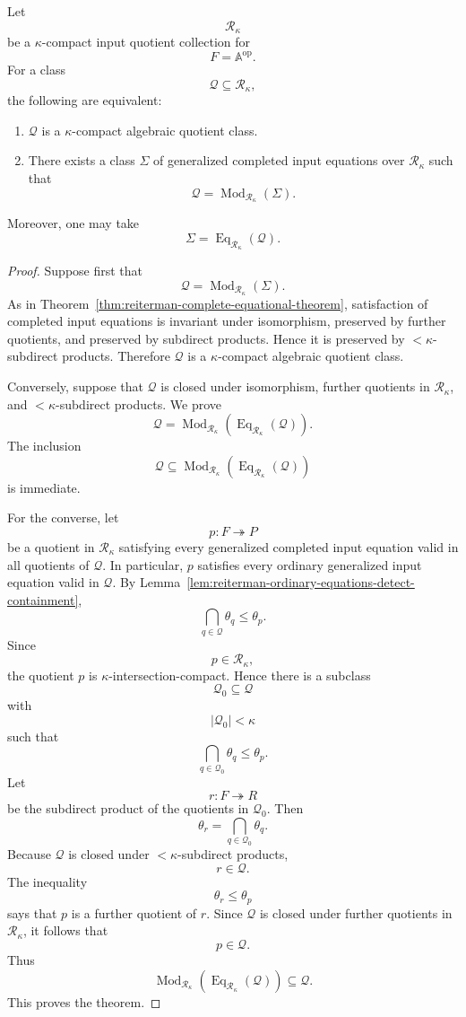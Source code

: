 \begin{theorem}
\label{thm:reiterman-intersection-compact}
Let
\[
\mathcal R_\kappa
\]
be a \(\kappa\)-compact input quotient collection for
\[
F=\mathbb A^{\mathrm{op}}.
\]
For a class
\[
\mathcal Q\subseteq\mathcal R_\kappa,
\]
the following are equivalent:
\begin{enumerate}
\item \(\mathcal Q\) is a \(\kappa\)-compact algebraic quotient class.
\item There exists a class \(\Sigma\) of generalized completed input equations
over \(\mathcal R_\kappa\) such that
\[
\mathcal Q=\operatorname{Mod}_{\mathcal R_\kappa}(\Sigma).
\]
\end{enumerate}
Moreover, one may take
\[
\Sigma=\operatorname{Eq}_{\mathcal R_\kappa}(\mathcal Q).
\]
\end{theorem}

\begin{proof}
Suppose first that
\[
\mathcal Q=\operatorname{Mod}_{\mathcal R_\kappa}(\Sigma).
\]
As in Theorem~\ref{thm:reiterman-complete-equational-theorem}, satisfaction
of completed input equations is invariant under isomorphism, preserved by
further quotients, and preserved by subdirect products. Hence it is preserved
by \(<\kappa\)-subdirect products. Therefore \(\mathcal Q\) is a
\(\kappa\)-compact algebraic quotient class.

Conversely, suppose that \(\mathcal Q\) is closed under isomorphism, further
quotients in \(\mathcal R_\kappa\), and \(<\kappa\)-subdirect products. We
prove
\[
\mathcal Q
=
\operatorname{Mod}_{\mathcal R_\kappa}
(\operatorname{Eq}_{\mathcal R_\kappa}(\mathcal Q)).
\]
The inclusion
\[
\mathcal Q
\subseteq
\operatorname{Mod}_{\mathcal R_\kappa}
(\operatorname{Eq}_{\mathcal R_\kappa}(\mathcal Q))
\]
is immediate.

For the converse, let
\[
p:F\twoheadrightarrow P
\]
be a quotient in \(\mathcal R_\kappa\) satisfying every generalized completed
input equation valid in all quotients of \(\mathcal Q\). In particular, \(p\)
satisfies every ordinary generalized input equation valid in \(\mathcal Q\).
By Lemma~\ref{lem:reiterman-ordinary-equations-detect-containment},
\[
\bigcap_{q\in\mathcal Q}\theta_q
\leq
\theta_p.
\]
Since
\[
p\in\mathcal R_\kappa,
\]
the quotient \(p\) is \(\kappa\)-intersection-compact. Hence there is a
subclass
\[
\mathcal Q_0\subseteq\mathcal Q
\]
with
\[
|\mathcal Q_0|<\kappa
\]
such that
\[
\bigcap_{q\in\mathcal Q_0}\theta_q
\leq
\theta_p.
\]
Let
\[
r:F\twoheadrightarrow R
\]
be the subdirect product of the quotients in \(\mathcal Q_0\). Then
\[
\theta_r
=
\bigcap_{q\in\mathcal Q_0}\theta_q.
\]
Because \(\mathcal Q\) is closed under \(<\kappa\)-subdirect products,
\[
r\in\mathcal Q.
\]
The inequality
\[
\theta_r\leq\theta_p
\]
says that \(p\) is a further quotient of \(r\). Since \(\mathcal Q\) is
closed under further quotients in \(\mathcal R_\kappa\), it follows that
\[
p\in\mathcal Q.
\]
Thus
\[
\operatorname{Mod}_{\mathcal R_\kappa}
(\operatorname{Eq}_{\mathcal R_\kappa}(\mathcal Q))
\subseteq
\mathcal Q.
\]
This proves the theorem.
\end{proof}

